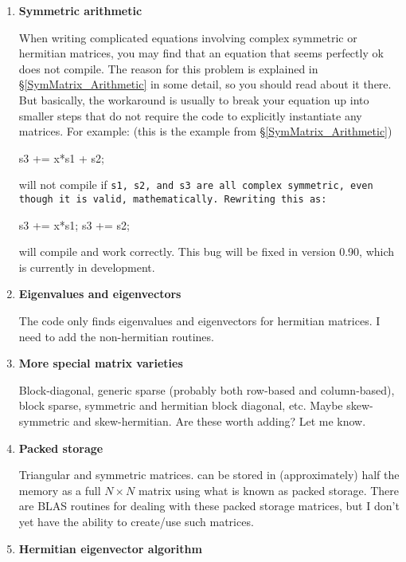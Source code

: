 \begin{enumerate}
\item
\textbf{Symmetric arithmetic}

When writing complicated equations involving complex symmetric or hermitian matrices, 
you may find that an equation that seems perfectly ok does not compile.
The reason for this problem is explained in \S\ref{SymMatrix_Arithmetic} in some detail, 
so you should read about it there.  But basically, the workaround is usually
to break your equation up into smaller steps that do not require the code to 
explicitly instantiate any matrices.  For example: (this is the example from \S\ref{SymMatrix_Arithmetic})
\begin{tmvcode}
s3 += x*s1 + s2;
\end{tmvcode}
will not compile if \tt{s1}, \tt{s2}, and \tt{s3} are all complex symmetric, even though it is 
valid, mathematically.  Rewriting this as:
\begin{tmvcode}
s3 += x*s1;
s3 += s2;
\end{tmvcode}
will compile and work correctly.  This bug will be fixed in version 0.90, which is currently
in development.

\item
\textbf{Eigenvalues and eigenvectors}

The code only finds eigenvalues and eigenvectors for hermitian matrices.
I need to add the non-hermitian routines.

\item
\textbf{More special matrix varieties}

Block-diagonal, generic sparse (probably both
row-based and column-based), block sparse, symmetric and hermitian block
diagonal, etc.  Maybe skew-symmetric and skew-hermitian.  Are these worth adding?  Let me know.

\item
\textbf{Packed storage}

Triangular and symmetric matrices. can be stored in (approximately) half the 
memory as a full $N \times N$ matrix using what is known as packed storage.  
There are BLAS routines for dealing with
these packed storage matrices, but I don't yet have the ability to 
create/use such matrices.

\item
\textbf{Hermitian eigenvector algorithm}
\label{Bugs_RRR}


\end{enumerate}
